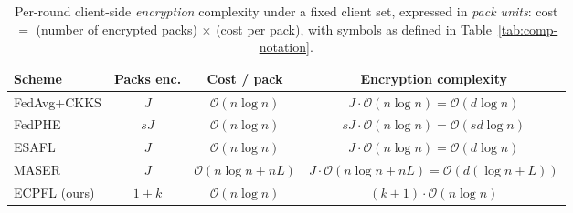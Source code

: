 %
%
\begin{table}[t]
\centering
\caption{Per-round client-side \emph{encryption} complexity under a fixed
client set, expressed in \emph{pack units}: cost $=$ (number of encrypted
packs) $\times$ (cost per pack), with symbols as defined in
Table~\ref{tab:comp-notation}.}
\label{tab:encryption-complexity}
\small
\renewcommand{\arraystretch}{1.25}
\begin{tabular}{@{}lccc@{}}
\toprule
\textbf{Scheme} & \textbf{Packs enc.} & \textbf{Cost / pack} &
\textbf{Encryption complexity} \\
\midrule
FedAvg+CKKS  & $J$  & $\mathcal{O}(n\log n)$    &
$J\cdot\mathcal{O}(n\log n)=\mathcal{O}(d\log n)$ \\[3pt]
FedPHE       & $sJ$ & $\mathcal{O}(n\log n)$    &
$sJ\cdot\mathcal{O}(n\log n)=\mathcal{O}(sd\log n)$ \\[3pt]
ESAFL        & $J$  & $\mathcal{O}(n\log n)$    &
$J\cdot\mathcal{O}(n\log n)=\mathcal{O}(d\log n)$ \\[3pt]
MASER        & $J$  & $\mathcal{O}(n\log n+nL)$ &
$J\cdot\mathcal{O}(n\log n+nL)=\mathcal{O}\!\left(d(\log n+L)\right)$ \\[3pt]
\midrule
ECPFL (ours) & $1+k$ & $\mathcal{O}(n\log n)$ &
$(k{+}1)\cdot\mathcal{O}(n\log n)$ \\
\bottomrule
\end{tabular}


\end{table}
